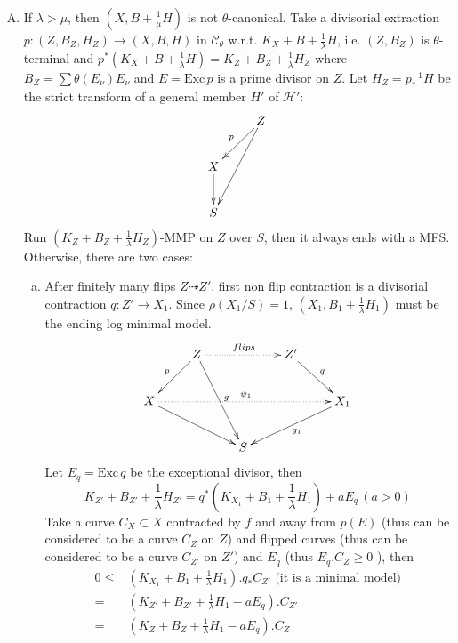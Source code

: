 \documentclass{article}
\begin{document}
\begin{enumerate}[(A)]
\begin{enumerate}[1)]
$${      &T &}$$
      This is a link of type IV. Since $ (K_{X_1}+B_1+\frac{1}{\mu}H_1) $ is trival on the ray $ R=\overline{NE}(X_1/S_1) $, we  have
      $$ \mu=\mu_1 $$
      Notice that $ (X_1,B_1+\frac{1}{\mu}H_1) $ stays $ \theta $-canonical, we have
      $$ \lambda_1\leqslant \mu=\mu_1 $$
  \end{enumerate}
\item If $ \lambda>\mu $, then $ (X,B+\frac{1}{\mu}H) $ is not $ \theta $-canonical. Take a divisorial extraction $ p:(Z,B_Z,H_Z)\to (X,B,H) $ in $ \mathcal{C}_\theta $ w.r.t. $ K_X+B+\frac{1}{\lambda}H $, i.e. $ (Z,B_Z) $ is $ \theta $-terminal and $ p^*(K_X+B+\frac{1}{\lambda}H)=K_Z+B_Z+\frac{1}{\lambda}H_Z $ where $ B_Z=\sum\theta(E_\nu)E_\nu $ and $ E=\mathrm{Exc}\,p $ is a prime divisor on $ Z $.  Let $ H_Z=p^{-1}_*H $ be the strict transform of a general member $ H' $ of $ \mathcal{H}' $:
  $$ \xymatrix{
    &Z\ar[ld]_p\ar[ldd]\\
    X\ar[d]&\\
  S} $$
  Run $ (K_Z+B_Z+\frac{1}{\lambda}H_Z) $-MMP on $ Z $ over $ S $, then it always ends with a MFS. Otherwise, there are two cases:
\begin{enumerate}[a)]
  \item After finitely many flips $ Z\dashrightarrow Z' $, first non flip contraction is a divisorial contraction $ q:Z'\to X_1 $. Since $ \rho(X_1/S)=1 $, $ (X_1,B_1+\frac{1}{\lambda}H_1) $ must be the ending log minimal model.
    $$ \xymatrix{
      &Z\ar[ld]_p\ar[rdd]^{g}\ar@{.>}[rr]^{flips}&&Z'\ar[dr]^{q}&\\
      X\ar[drr]\ar@{.>}[rrrr]^{\psi_1}&&&&X_1\ar[dll]^{g_1}\\
    &&S&&} $$
    Let $ E_q=\mathrm{Exc}\,q $ be the exceptional divisor, then
    $$ K_{Z'}+B_{Z'}+\frac{1}{\lambda}H_{Z'}=q^*(K_{X_1}+B_1+\frac{1}{\lambda}H_1)+aE_q \,(a>0)$$
    Take a curve $ C_X\subset X $ contracted by $ f $ and away from $ p(E) $ (thus can be considered to be a curve $ C_Z $ on $ Z $) and flipped curves (thus can be considered to be a curve $ C_{Z'} $ on $ Z' $) and $ E_q $ (thus $ E_q.C_Z\geqslant 0 $ ), then
    \begin{equation*}
      \begin{aligned}
        0\leqslant& (K_{X_1}+B_1+\frac{1}{\lambda}H_1).q_*C_{Z'} \text{ (it is a minimal model)}\\
        =&(K_{Z'}+B_{Z'}+\frac{1}{\lambda}H_1-aE_q).C_{Z'}\\
        =&(K_{Z}+B_{Z}+\frac{1}{\lambda}H_1-aE_q).C_{Z}\\

\end{aligned}
\end{equation*}
\end{enumerate}
\end{enumerate}
\end{document}

